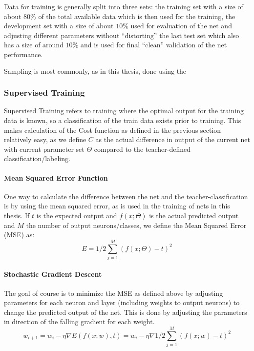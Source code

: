 Data for training is generally split into three sets: the training set with a size of about \(80\%\) of the total available data which is then used for the training, the development set with a size of about \(10\%\) used for evaluation of the net and adjusting different parameters without ``distorting'' the last test set which also has a size of around \(10\%\) and is used for final ``clean'' validation of the net performance.

Sampling is most commonly, as in this thesis, done using the 

\subsubsection{Supervised Training}
\label{sec:fund:ST}
Supervised Training refers to training where the optimal output for the training data is known, so a classification of the train data exists prior to training. This makes calculation of the Cost function as defined in the previous section relatively easy, as we define \(C\) as the actual difference in output of the current net with current parameter set \(\Theta\) compared to the teacher-defined classification/labeling. 

\paragraph{Mean Squared Error Function}

One way to calculate the difference between the net and the teacher-classification is by using the mean squared error, as is used in the training of nets in this thesis. If  \(t\) is the expected output and \(f(x;\Theta)\) is the actual predicted output and \(M\) the number of output neurons/classes, we define the Mean Squared Error (MSE) as:
\begin{equation}
E = 1 / 2 \sum_{j=1}^{M}(f(x;\Theta) - t)^2
\end{equation}

\paragraph{Stochastic Gradient Descent} The goal of course is to minimize the MSE as defined above by adjusting parameters for each neuron and layer (including weights to output neurons) to change the predicted output of the net.  This is done by adjusting the parameters in direction of the falling gradient for each weight.
\begin{equation}
w_{i+1} = w_i - \eta \nabla E(f(x;w), t) = w_i - \eta \nabla 1/2\sum_{j=1}^M(f(x;w) - t)^2
\end {equation}

